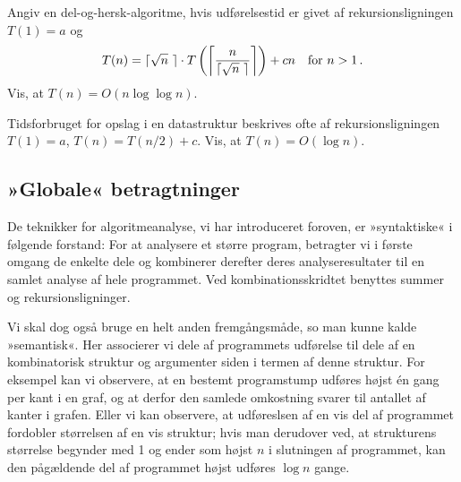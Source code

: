 \begin{exerc}
  Angiv en del-og-hersk-algoritme, hvis udførelsestid er givet af rekursionsligningen
  $T(1)=a$ og \[
    T(n)=\lceil \sqrt{n}\,\,\rceil\cdot T\left(\left\lceil\frac{n}{\lceil \sqrt{n}\,\,\rceil}\right\rceil\right)  + cn\quad \text{for }n>1\,.\]
  Vis, at $T(n)=O(n\log\log n)$.
\end{exerc}

\begin{exerc}
  Tidsforbruget for opslag i en datastruktur beskrives ofte af rekursionsligningen
$T(1)=a$, $T(n)=T(n/2) + c$.
Vis, at $T(n)=O(\log n)$.
\end{exerc}

\subsection{»Globale« betragtninger} 

De teknikker for algoritmeanalyse, vi har introduceret foroven, er »syntaktiske« i følgende forstand:
For at analysere et større program, betragter vi i første omgang de enkelte dele og kombinerer derefter deres analyseresultater til en samlet analyse af hele programmet.
Ved kombinationsskridtet benyttes summer og rekursionsligninger.

Vi skal dog også bruge en helt anden fremgångsmåde, so man kunne kalde »semantisk«.
Her associerer vi dele af programmets udførelse til dele af en kombinatorisk struktur og argumenter siden i termen af denne struktur.
For eksempel kan vi observere, at en bestemt programstump udføres højst én gang per kant i en graf, og at derfor den samlede omkostning svarer til antallet af kanter i grafen.
Eller vi kan observere, at udføreslsen af en vis del af programmet fordobler størrelsen af en vis struktur;
hvis man derudover ved, at strukturens størrelse begynder med 1 og ender som højst $n$ i slutningen af programmet, kan den pågældende del af programmet højst udføres $\log n$ gange.

